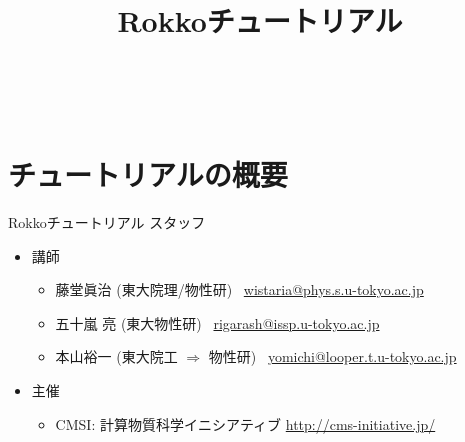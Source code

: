 \title{Rokkoチュートリアル}




\begin{frame}
  \titlepage
   \\
\end{frame}


\section{チュートリアルの概要}

\begin{frame}{Rokkoチュートリアル スタッフ}
  \begin{itemize}
  \item 講師
    \setlength{\itemsep}{1em}
    \begin{itemize}
      \setlength{\itemsep}{1em}
    \item 藤堂眞治 (東大院理/物性研) \ \href{mailto:wistaria@phys.s.u-tokyo.ac.jp}{wistaria@phys.s.u-tokyo.ac.jp}
    \item 五十嵐 亮 (東大物性研) \ \href{mailto:rigarash@issp.u-tokyo.ac.jp}{rigarash@issp.u-tokyo.ac.jp}
    \item 本山裕一 (東大院工 $\Rightarrow $ 物性研) \ \href{mailto:yomichi@looper.u-tokyo.ac.jp}{yomichi@looper.t.u-tokyo.ac.jp}
    \end{itemize}
  \item 主催
    \begin{itemize}
    \item CMSI: 計算物質科学イニシアティブ \url{http://cms-initiative.jp/}
    \end{itemize}
  \end{itemize}
\end{frame}


